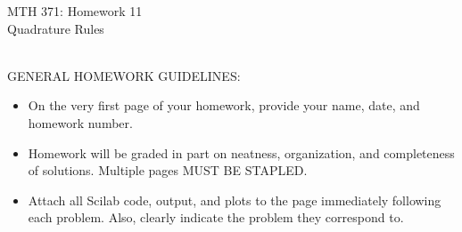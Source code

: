 \documentclass[addpoints, 11pt]{exam}
\begin{document}
\vspace{100mm}
\begin{center} \Large
MTH 371: Homework 11 \\ Quadrature Rules \normalsize
\end{center}
\ \\
\noindent GENERAL HOMEWORK GUIDELINES: 
\begin{itemize}
\item On the very first page of your homework, provide your name, date, and homework number.\vspace{-2mm}
\item Homework will be graded in part on neatness, organization, and completeness of solutions. Multiple pages MUST BE STAPLED. \vspace{-2mm}
\item Attach all Scilab code, output, and plots to the page immediately following each problem. Also, clearly indicate the problem they correspond to.
\end{itemize}
\end{document}
